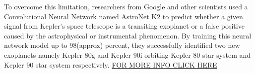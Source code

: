 \documentclass[a4paper]{article}
\begin{document}
To overcome this limitation, researchers from Google and other scientists used a Convolutional Neural Network named AstroNet K2 to predict whether a given signal from Kepler’s space telescope is a transiting exoplanet or a false positive caused by the astrophysical or instrumental phenomenon. By training this neural network model up to 98(approx) percent, they successfully identified two new exoplanets namely Kepler 80g and Kepler 90i orbiting Kepler 80 star system and Kepler 90 star system respectively.
\href{https://www.nasa.gov/press-release/artificial-intelligence-nasa-data-used-to-discover-eighth-planet-circling-distant-star}{FOR MORE INFO CLICK HERE}
\end{document}
